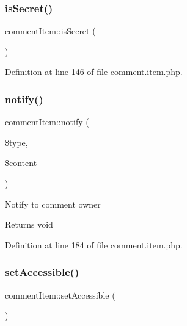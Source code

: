\hypertarget{classcommentItem_abae79d7831d1674aec166e449a70dca7}{}\label{classcommentItem_abae79d7831d1674aec166e449a70dca7} 
\subsubsection{\texorpdfstring{is\+Secret()}{isSecret()}}
{\footnotesize\ttfamily comment\+Item\+::is\+Secret (\begin{DoxyParamCaption}{ }\end{DoxyParamCaption})}



Definition at line 146 of file comment.\+item.\+php.

\hypertarget{classcommentItem_a7fb0c8b5afc30c493450664c8b885db5}{}\label{classcommentItem_a7fb0c8b5afc30c493450664c8b885db5} 
\subsubsection{\texorpdfstring{notify()}{notify()}}
{\footnotesize\ttfamily comment\+Item\+::notify (\begin{DoxyParamCaption}\item[{}]{\$type,  }\item[{}]{\$content }\end{DoxyParamCaption})}

Notify to comment owner \begin{DoxyReturn}{Returns}
void 
\end{DoxyReturn}


Definition at line 184 of file comment.\+item.\+php.

\hypertarget{classcommentItem_af9af617b212fccb1f308ff0b0feff48f}{}\label{classcommentItem_af9af617b212fccb1f308ff0b0feff48f} 
\subsubsection{\texorpdfstring{set\+Accessible()}{setAccessible()}}
{\footnotesize\ttfamily comment\+Item\+::set\+Accessible (\begin{DoxyParamCaption}{ }\end{DoxyParamCaption})}



